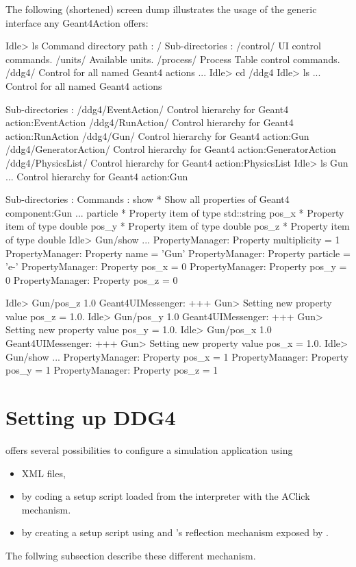 \documentclass[10pt,a4paper]{article}
\begin{document}
\noindent
The following (shortened) screen dump illustrates the usage of the 
generic interface any Geant4Action offers:
\begin{unnumberedcode}
Idle> ls
Command directory path : /
 Sub-directories : 
   /control/   UI control commands.
   /units/   Available units.
   /process/   Process Table control commands.
   /ddg4/   Control for all named Geant4 actions
   ...
Idle> cd /ddg4
Idle> ls
...
Control for all named Geant4 actions

 Sub-directories : 
   /ddg4/EventAction/   Control hierarchy for Geant4 action:EventAction
   /ddg4/RunAction/   Control hierarchy for Geant4 action:RunAction
   /ddg4/Gun/   Control hierarchy for Geant4 action:Gun
   /ddg4/GeneratorAction/   Control hierarchy for Geant4 action:GeneratorAction
   /ddg4/PhysicsList/   Control hierarchy for Geant4 action:PhysicsList
Idle> ls Gun            
...
Control hierarchy for Geant4 action:Gun

 Sub-directories : 
 Commands : 
   show * Show all properties of Geant4 component:Gun
...
   particle * Property item of type std::string
   pos_x * Property item of type double
   pos_y * Property item of type double
   pos_z * Property item of type double
Idle> Gun/show
...
PropertyManager: Property multiplicity = 1
PropertyManager: Property name = 'Gun'
PropertyManager: Property particle = 'e-'
PropertyManager: Property pos_x = 0
PropertyManager: Property pos_y = 0
PropertyManager: Property pos_z = 0

Idle> Gun/pos_z 1.0   
Geant4UIMessenger: +++ Gun> Setting new property value pos_z = 1.0.
Idle> Gun/pos_y 1.0
Geant4UIMessenger: +++ Gun> Setting new property value pos_y = 1.0.
Idle> Gun/pos_x 1.0
Geant4UIMessenger: +++ Gun> Setting new property value pos_x = 1.0.
Idle> Gun/show
...
PropertyManager: Property pos_x = 1
PropertyManager: Property pos_y = 1
PropertyManager: Property pos_z = 1

\end{unnumberedcode}


\newpage
\section{Setting up DDG4}
\label{sec:ddg4-implementation-setup}

\noindent
\DDG offers several possibilities to configure a simulation application
using
\begin{itemize}\itemcompact
\item XML files,
\item by coding a setup script loaded from the  interpreter 
	with the AClick	mechanism.
\item by creating a setup script using  and 
	's reflection mechanism exposed by .
\end{itemize}
The follwing subsection describe these different mechanism.
\end{document}
